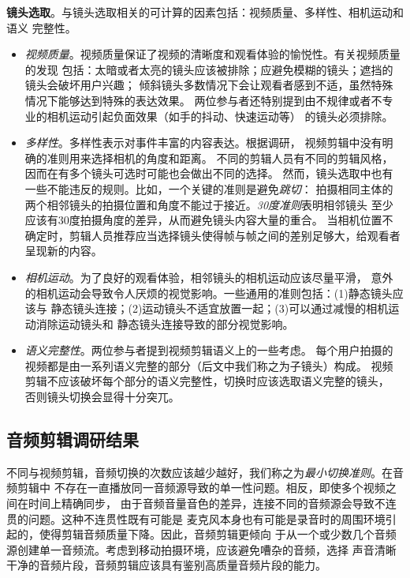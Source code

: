 \documentclass[doctor]{ustcthesis}
\begin{document}
\textbf{镜头选取}。与镜头选取相关的可计算的因素包括：视频质量、多样性、相机运动和语义
完整性。
\begin{itemize}\setlength{\itemsep}{-0.5em}
    \item \emph{视频质量}。视频质量保证了视频的清晰度和观看体验的愉悦性。有关视频质量的发现
        包括：太暗或者太亮的镜头应该被排除；应避免模糊的镜头；遮挡的镜头会破坏用户兴趣；
        倾斜镜头多数情况下会让观看者感到不适，虽然特殊情况下能够达到特殊的表达效果。
        两位参与者还特别提到由不规律或者不专业的相机运动引起负面效果（如手的抖动、快速运动等）
        的镜头必须排除。
    \item \emph{多样性}。多样性表示对事件丰富的内容表达。根据调研，
        视频剪辑中没有明确的准则用来选择相机的角度和距离。
        不同的剪辑人员有不同的剪辑风格，因而在有多个镜头可选时可能也会做出不同的选择。
        然而，镜头选取中也有一些不能违反的规则。比如，一个关键的准则是避免\emph{跳切}：
        拍摄相同主体的两个相邻镜头的拍摄位置和角度不能过于接近。\emph{30度准则}表明相邻镜头
        至少应该有30度拍摄角度的差异，从而避免镜头内容大量的重合。
        当相机位置不确定时，剪辑人员推荐应当选择镜头使得帧与帧之间的差别足够大，给观看者
        呈现新的内容。
    \item \emph{相机运动}。为了良好的观看体验，相邻镜头的相机运动应该尽量平滑，
        意外的相机运动会导致令人厌烦的视觉影响。一些通用的准则包括：(1)静态镜头应该与
        静态镜头连接；(2)运动镜头不适宜放置一起；(3)可以通过减慢的相机运动消除运动镜头和
        静态镜头连接导致的部分视觉影响。
    \item \emph{语义完整性}。两位参与者提到视频剪辑语义上的一些考虑。
        每个用户拍摄的视频都是由一系列语义完整的部分（后文中我们称之为子镜头）构成。
        视频剪辑不应该破坏每个部分的语义完整性，切换时应该选取语义完整的镜头，
        否则镜头切换会显得十分突兀。
\end{itemize}

\subsection{音频剪辑调研结果}
不同与视频剪辑，音频切换的次数应该越少越好，我们称之为\emph{最小切换准则}。在音频剪辑中
不存在一直播放同一音频源导致的单一性问题。相反，即使多个视频之间在时间上精确同步，
由于音频音量音色的差异，连接不同的音频源会导致不连贯的问题。这种不连贯性既有可能是
麦克风本身也有可能是录音时的周围环境引起的，使得剪辑音频质量下降。因此，音频剪辑更倾向
于从一个或少数几个音频源创建单一音频流。考虑到移动拍摄环境，应该避免嘈杂的音频，选择
声音清晰干净的音频片段，音频剪辑应该具有鉴别高质量音频片段的能力。
\end{document}
